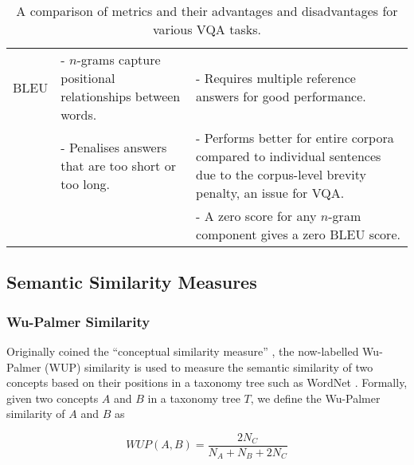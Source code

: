 \begin{table}[htbp]
\begin{footnotesize}
\begin{tabularx}{\linewidth}{@{}lLL@{}}
            BLEU                                & - \(n\)-grams capture positional relationships between words.                              & - Requires multiple reference answers for good performance.                                                                                                          \\
                                                & - Penalises answers that are too short or too long.                                        & - Performs better for entire corpora compared to individual sentences due to the corpus-level brevity penalty, an issue for VQA.                                        \\
                                                &                                                                                            & - A zero score for any \(n\)-gram component gives a zero BLEU score.                                                                                                    \\\bottomrule
    \end{tabularx}
    \end{footnotesize}
    \caption[Advantages and disadvantages of metrics for various VQA tasks]{A comparison of metrics and their advantages and disadvantages for various VQA tasks.}
    \label{tab:vqa_metrics_comparison}
\end{table}

\subsection{Semantic Similarity Measures}

\subsubsection{Wu-Palmer Similarity}

Originally coined the ``conceptual similarity measure'' \cite{wu1994verbs}, the now-labelled Wu-Palmer (WUP) similarity is used to measure the semantic similarity of two concepts based on their positions in a taxonomy tree such as WordNet \cite{miller1995wordnet}. Formally, given two concepts \(A\) and \(B\) in a taxonomy tree \(T\), we define the Wu-Palmer similarity of \(A\) and \(B\) as

\begin{equation}
    WUP(A, B) = \frac{2 N_C}{N_A + N_B + 2 N_C}
    \label{equation:wup}
\end{equation}

